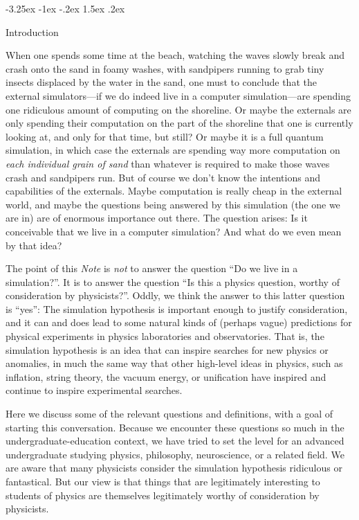 \documentclass[letterpaper]{article}
\makeatletter
\renewcommand\section{\@startsection {section}{1}{\z@}%
  {-3.25ex \@plus -1ex \@minus -.2ex}%
  {1.5ex \@plus .2ex}%
  {\raggedright\normalfont\large\bfseries}}
\newcommand{\documentname}{\textsl{Note}}
\makeatother
\begin{document}
\section{Introduction}

When one spends some time at the beach, watching the waves slowly break and crash onto the sand in foamy washes, with sandpipers running to grab tiny insects displaced by the water in the sand, one must to conclude that the external simulators---if we do indeed live in a computer simulation---are spending one ridiculous amount of computing on the shoreline.
Or maybe the externals are only spending their computation on the part of the shoreline that one is currently looking at, and only for that time, but still?
Or maybe it is a full quantum simulation, in which case the externals are spending way more computation on \emph{each individual grain of sand} than whatever is required to make those waves crash and sandpipers run.
But of course we don't know the intentions and capabilities of the externals.
Maybe computation is really cheap in the external world, and maybe the questions being answered by this simulation (the one we are in) are of enormous importance out there.
The question arises: Is it conceivable that we live in a computer simulation?
And what do we even mean by that idea?

The point of this \documentname{} is \emph{not} to answer the question ``Do we live in a simulation?''.
It is to answer the question ``Is this a physics question, worthy of consideration by physicists?''.
Oddly, we think the answer to this latter question is ``yes'':
The simulation hypothesis is important enough to justify consideration, and it can and does lead to some natural kinds of (perhaps vague) predictions for physical experiments in physics laboratories and observatories.
That is, the simulation hypothesis is an idea that can inspire searches for new physics or anomalies, in much the same way that other high-level ideas in physics, such as inflation, string theory, the vacuum energy, or unification have inspired and continue to inspire experimental searches.

Here we discuss some of the relevant questions and definitions, with a goal of starting this conversation.
Because we encounter these questions so much in the undergraduate-education context, we have tried to set the level for an advanced undergraduate studying physics, philosophy, neuroscience, or a related field.
We are aware that many physicists consider the simulation hypothesis ridiculous or fantastical.
But our view is that things that are legitimately interesting to students of physics are themselves legitimately worthy of consideration by physicists.
\end{document}
